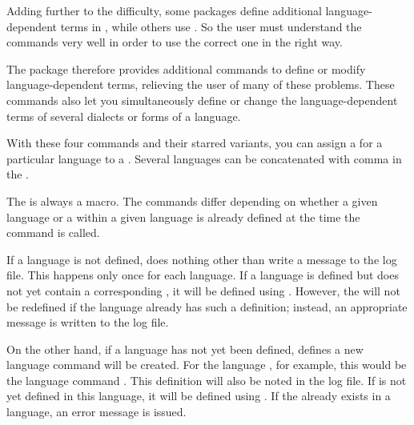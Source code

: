 Adding further to the difficulty, some packages define additional
language-dependent terms in , while others use
. So the user must understand the commands very
well in order to use the correct one in the right way.

The  package therefore provides additional commands to define
or modify language-dependent terms, relieving the user of many of these
problems. These commands also let you simultaneously define or change the
language-dependent terms of several dialects or forms of a language.

\begin{Declaration}
\end{Declaration}
With these four commands and their starred variants, you can assign a
 for a particular language to a . Several
languages can be concatenated with comma in the .

The  is always a macro. The commands differ depending on whether a
given language or a  within a given language is already defined at
the time the command is called.

If a language is not defined,  does nothing other
than write a message to the log file. This happens only once for each
language. If a language is defined but does not yet contain a corresponding
, it will be defined using . However, the
 will not be redefined if the language already has such a
definition; instead, an appropriate message is written to the log file.

On the other hand, if a language has not yet been defined,
 defines a new language command will be created. For the
language , for example, this would be the language command
. This definition will also be noted in the log file.
If  is not yet defined in this language, it will be defined using
. If the  already exists in a language, an error
message is issued.

